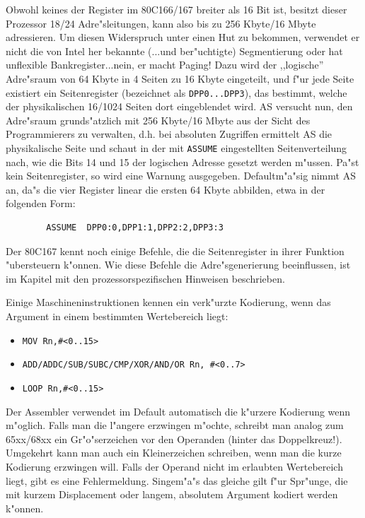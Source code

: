 \documentclass[12pt,a4paper,twoside]{report}
\newcommand{\tty}[1]{{\tt #1}}
\newcommand{\asname}{AS}
\begin{document}
Obwohl keines der Register im 80C166/167 breiter als 16 Bit ist, besitzt
dieser Prozessor 18/24 Adre"sleitungen, kann also bis zu 256 Kbyte/16 Mbyte
adressieren.  Um diesen Widerspruch unter einen Hut zu bekommen, verwendet
er nicht die von Intel her bekannte (...und ber"uchtigte) Segmentierung oder
hat unflexible Bankregister...nein, er macht Paging!  Dazu wird der ,,logische''
Adre"sraum von 64 Kbyte in 4 Seiten zu 16 Kbyte eingeteilt, und f"ur jede
Seite existiert ein Seitenregister (bezeichnet als \tty{DPP0...DPP3}), das
bestimmt, welche der physikalischen 16/1024 Seiten dort eingeblendet wird.  \asname{} versucht
nun, den Adre"sraum grunds"atzlich mit 256 Kbyte/16 Mbyte aus der Sicht des
Programmierers zu verwalten, d.h. bei absoluten Zugriffen ermittelt \asname{} die
physikalische Seite und schaut in der mit \tty{ASSUME} eingestellten
Seitenverteilung nach, wie die Bits 14 und 15 der logischen Adresse gesetzt
werden m"ussen.  Pa"st kein Seitenregister, so wird eine Warnung ausgegeben.
Defaultm"a"sig nimmt \asname{} an, da"s die vier Register linear die ersten 64 Kbyte
abbilden, etwa in der folgenden Form:
\begin{verbatim}
        ASSUME  DPP0:0,DPP1:1,DPP2:2,DPP3:3
\end{verbatim}
Der 80C167 kennt noch einige Befehle, die die Seitenregister in ihrer
Funktion "ubersteuern k"onnen.  Wie diese Befehle die Adre"sgenerierung
beeinflussen, ist im Kapitel mit den prozessorspezifischen Hinweisen
beschrieben.
\par
Einige Maschineninstruktionen kennen ein verk"urzte Kodierung, wenn das
Argument in einem bestimmten Wertebereich liegt:
\begin{itemize}
\item{\verb!MOV Rn,#<0..15>!}
\item{\verb!ADD/ADDC/SUB/SUBC/CMP/XOR/AND/OR Rn, #<0..7>!}
\item{\verb!LOOP Rn,#<0..15>!}
\end{itemize}
Der Assembler verwendet im Default automatisch die k"urzere Kodierung
wenn m"oglich.  Falls man die l"angere erzwingen m"ochte, schreibt
man analog zum 65xx/68xx ein Gr"o"serzeichen vor den Operanden (hinter
das Doppelkreuz!).  Umgekehrt kann man auch ein Kleinerzeichen schreiben,
wenn man die kurze Kodierung erzwingen will.  Falls der Operand nicht
im erlaubten Wertebereich liegt, gibt es eine Fehlermeldung.  Singem"a"s
das gleiche gilt f"ur Spr"unge, die mit kurzem Displacement oder langem,
absolutem Argument kodiert werden k"onnen.
\end{document}
